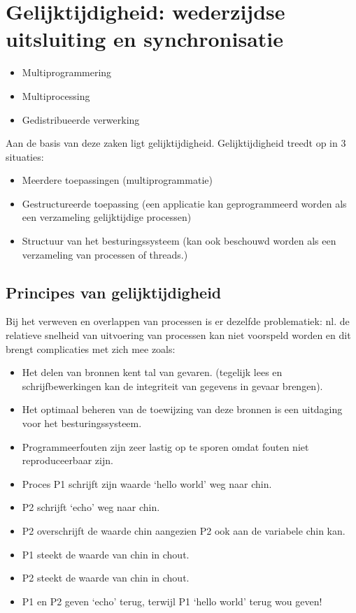 \section{Gelijktijdigheid: wederzijdse uitsluiting en synchronisatie}

\begin{itemize}
\item Multiprogrammering
\item Multiprocessing
\item Gedistribueerde verwerking
\end{itemize}

Aan de basis van deze zaken ligt gelijktijdigheid. Gelijktijdigheid treedt op in 3 situaties:

\begin{itemize}
\item Meerdere toepassingen (multiprogrammatie)
\item Gestructureerde toepassing (een applicatie kan geprogrammeerd worden als een verzameling gelijktijdige processen)
\item Structuur van het besturingssysteem (kan ook beschouwd worden als een verzameling van processen of threads.)
\end{itemize}

\subsection{Principes van gelijktijdigheid}

Bij het verweven en overlappen van processen is er dezelfde problematiek: nl. de relatieve snelheid van uitvoering van processen kan niet voorspeld worden en dit brengt complicaties met zich mee zoals:

\begin{itemize}
\item Het delen van bronnen kent tal van gevaren. (tegelijk lees en schrijfbewerkingen kan de integriteit van gegevens in gevaar brengen).
\item Het optimaal beheren van de toewijzing van deze bronnen is een uitdaging voor het besturingssysteem.
\item Programmeerfouten zijn zeer lastig op te sporen omdat fouten niet reproduceerbaar zijn.
\end{itemize}

\begin{itemize}
\item Proces P1 schrijft zijn waarde ‘hello world’ weg naar chin.
\item P2 schrijft ‘echo’ weg naar chin.
\item P2 overschrijft de waarde chin aangezien P2 ook aan de variabele chin kan.
\item P1 steekt de waarde van chin in chout.
\item P2 steekt de waarde van chin in chout.
\item P1 en P2 geven ‘echo’ terug, terwijl P1 ‘hello world’ terug wou geven!
\end{itemize}

